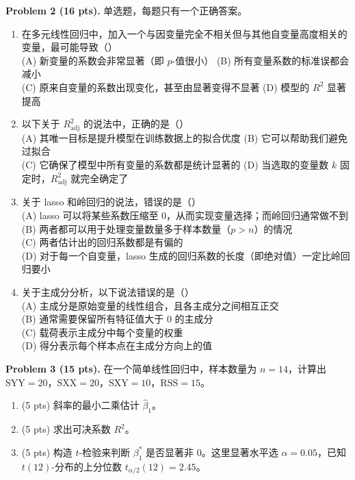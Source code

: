 \documentclass[11pt]{ctexart}
\newcommand{\fillblank}{\mbox{（\qquad）}}
\begin{document}
\noindent\textbf{Problem 2 (16 pts).} 单选题，每题只有一个正确答案。
\begin{enumerate}
\item 在多元线性回归中，加入一个与因变量完全不相关但与其他自变量高度相关的变量，最可能导致\fillblank\\
(A) 新变量的系数会非常显著（即 $p$-值很小）\quad
(B) 所有变量系数的标准误都会减小\\
(C) 原来自变量的系数出现变化，甚至由显著变得不显著\quad
(D) 模型的 $R^2$ 显著提高
\item 以下关于 $R^2_{\mathrm{adj}}$ 的说法中，正确的是\fillblank\\
(A) 其唯一目标是提升模型在训练数据上的拟合优度\quad
(B) 它可以帮助我们避免过拟合\\
(C) 它确保了模型中所有变量的系数都是统计显著的\quad
(D) 当选取的变量数 $k$ 固定时，$R^2_{\mathrm{adj}}$ 就完全确定了
\item 关于 lasso 和岭回归的说法，错误的是\fillblank\\
(A) lasso 可以将某些系数压缩至 $0$，从而实现变量选择；而岭回归通常做不到\\
(B) 两者都可以用于处理变量数量多于样本数量（$p > n$）的情况\\
(C) 两者估计出的回归系数都是有偏的\\
(D) 对于每一个自变量，lasso 生成的回归系数的长度（即绝对值）一定比岭回归要小
\item 关于主成分分析，以下说法错误的是\fillblank\\
(A) 主成分是原始变量的线性组合，且各主成分之间相互正交\\
(B) 通常需要保留所有特征值大于 $0$ 的主成分\\
(C) 载荷表示主成分中每个变量的权重\\
(D) 得分表示每个样本点在主成分方向上的值
\end{enumerate}

\noindent\textbf{Problem 3 (15 pts).} 在一个简单线性回归中，样本数量为 $n = 14$，计算出 $\mathrm{SYY} = 20$，$\mathrm{SXX} = 20$，$\mathrm{SXY} = 10$，$\mathrm{RSS} = 15$。
\begin{enumerate}
\item (5 pts) 斜率的最小二乘估计 $\hat{\beta}_1$。
\item (5 pts) 求出可决系数 $R^2$。
\item (5 pts) 构造 $t$-检验来判断 $\beta_1^*$ 是否显著非 $0$。这里显著水平选 $\alpha = 0.05$，已知 $t(12)$-分布的上分位数 $t_{\alpha/2}(12) = 2.45$。
\end{enumerate}
\end{document}
